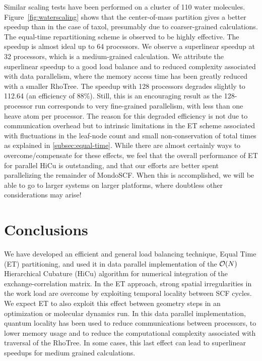 \commentoutA{\documentclass[prb,aps,twocolumn,twocolumngrid]{revtex4}}
\begin{document}
Similar scaling tests have been performed on a cluster of 110 water
molecules.  Figure~\ref{fig:waterscaling} shows that the
center-of-mass partition gives a better speedup than in the case of
taxol, presumably due to coarser-grained calculations.  The equal-time
repartitioning scheme is observed to be highly effective.  The speedup
is almost ideal up to 64 processors. We observe a superlinear speedup
at 32 processors, which is a medium-grained calculation.
We attribute the superlinear speedup to a good load
balance and to reduced complexity associated with data parallelism, 
where the memory access time has been greatly reduced with a smaller RhoTree.  
The speedup with 128 processors degrades slightly to 112.64 (an
efficiency of 88\%).  Still, this is an encouraging result as
the 128-processor run corresponds to very fine-grained parallelism,
with less than one heave atom per processor. The reason for this degraded efficiency 
is not due to communication overhead but to intrinsic limitations in the ET
scheme associated with fluctuations in the leaf-node count and small non-conservation of
total times as explained in \ref{subsec:equal-time}.   While there are almost certainly 
ways to overcome/compensate for these effects, we feel that the overall performance of ET 
for parallel HiCu is outstanding, and that our efforts are better spent parallelizing the 
remainder of {\sc MondoSCF}.  When this is accomplished, we will be able to 
go to larger systems on larger platforms, where doubtless other considerations may arise!

\section{Conclusions}
\label{sec:conclusions}


We have developed an efficient and general load balancing technique, Equal Time (ET) 
partitioning, and used it in data parallel implementation of the ${\cal O}(N)$ 
Hierarchical Cubature (HiCu) algorithm for numerical integration of the exchange-correlation 
matrix.  In the ET approach, strong spatial irregularities in the work load are overcome by exploiting 
temporal locality between SCF cycles.  We expect ET to also exploit this effect
between geometry steps in an optimization or molecular dynamics run.
In this data parallel implementation, quantum locality has been used to reduce communications 
between processors, to lower memory usage and to reduce the computational complexity 
associated with traversal of the RhoTree.  In some cases, this last effect can lead to
superlinear speedups for medium grained calculations.
\end{document}
